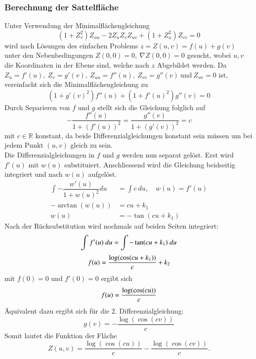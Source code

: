 \begin{refsection}
\subsubsection{Berechnung der Sattelfläche}\label{Scherk Berechnung}
Unter Verwendung der Minimalflächengleichung
\begin{equation}\label{Minimalflaechengleichung}
(1+ Z_v^{2})Z_{uu} - 2 Z_u Z_v Z_{uv} + (1+ Z_u^{2}) Z_{vv}=0
\end{equation}
wird nach Lösungen des einfachen Problems $z=Z(u,v)=f(u)+g(v)$ unter den Nebenbedingungen $Z(0,0)=0,\ \nabla Z(0,0)=0$ gesucht, wobei ${u,v}$ die Koordinaten in der Ebene sind, welche nach $z$ Abgebildet werden. 
Da $ Z_u = f'(u),\ Z_v = g'(v),\ Z_{uu}=f''(u),\ Z_{vv} = g''(v) \ \text{und} \ Z_{uv}=0$ ist, vereinfacht sich die Minimalflächengleichung zu 
\begin{equation}\label{MFG Scherk}
(1+g'(v)^2)f''(u)+(1+f'(u)^2)g''(v)=0
\end{equation}
Durch Separieren von $f$ und $g$ stellt sich die Gleichung folglich auf
\begin{equation}\label{MFG Scherk2}
-\dfrac{f''(u)}{1+(f'(u))^2}=\dfrac{g''(v)}{1+(g'(v))^2}=c
\end{equation}
mit $c \in \mathbb{R}$ konstant, da beide Differenzialgleichungen konstant sein müssen um bei jedem Punkt $(u,v)$ gleich zu sein.\\
Die Differenzialgleichungen in $f$ und $g$ werden nun separat gelöst. Erst wird $f'(u)$ mit $w(u)$ substituiert. Anschliessend wird die Gleichung  beidseitig integriert und nach $w(u)$ aufgelöst.
\begin{equation}\label{ScherkDGL1}
\begin{split}
\int -\dfrac{w'(u)}{1+w(u)^2} du &= \int c \ du , \quad w(u)=f'(u) \\
-\arctan(w(u)) &= cu+k_1 \\
w(u) &= -\tan(cu+k_1)
\end{split}
\end{equation}
Nach der Rücksubstitution wird nochmals auf beiden Seiten integriert:
\begin{equation}\label{SchreckDGL2}
\int f'(u)\ du = \int -\tan(cu+k_1)\ du\\
\end{equation}
\begin{equation}
f(u) = \dfrac{\log(\cos(cu+k_1))}{c}+k_2\\
\end{equation}
mit $f(0)=0$ und $f'(0)=0$ ergibt sich
\begin{equation}
f(u) = \dfrac{\log(\cos(cu))}{c}\\
\end{equation}
Äquivalent dazu ergibt sich für die 2. Differenzialgleichung:
\begin{equation}
g(v) = - \dfrac{\log(\cos(cv))}{c}
\end{equation}
Somit lautet die Funktion der Fläche
\begin{equation}
Z(u,v)=\dfrac{\log(\cos(cu))}{c}-\dfrac{\log(\cos(cv))}{c}.
\end{equation}


\end{refsection}
